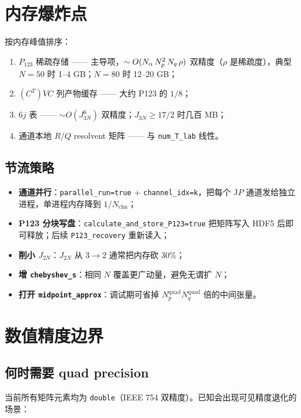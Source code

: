 \section{内存爆炸点}
\label{sec:appF_memory}

按内存峰值排序：
\begin{enumerate}
  \item \(P_{123}\) 稀疏存储 —— 主导项，\(\sim O(N_\alpha\,N_p^2\,N_q\,\rho)\) 双精度（\(\rho\) 是稀疏度），典型 \(N=50\) 时 1–4 GB；\(N=80\) 时 12–20 GB；
  \item \((C^T)V C\) 列产物缓存 —— 大约 P123 的 \(1/8\)；
  \item 6\(j\) 表 —— \(\sim O(J_{3N}^6)\) 双精度；\(J_{3N}\ge 17/2\) 时几百 MB；
  \item 通道本地 \(R\)/\(Q\) resolvent 矩阵 —— 与 \texttt{num\_T\_lab} 线性。
\end{enumerate}

\subsection{节流策略}

\begin{itemize}
  \item \textbf{通道并行}：\texttt{parallel\_run=true} + \texttt{channel\_idx=k}，把每个 J\(P\) 通道发给独立进程，单进程内存降到 \(1/N_\text{chn}\)；
  \item \textbf{P123 分块写盘}：\texttt{calculate\_and\_store\_P123=true} 把矩阵写入 HDF5 后即可释放；后续 \texttt{P123\_recovery} 重新读入；
  \item \textbf{削小 \(J_{2N}\)}：\(J_{2N}\) 从 \(3\to 2\) 通常把内存砍 30\%；
  \item \textbf{增 \texttt{chebyshev\_s}}：相同 \(N\) 覆盖更广动量，避免无谓扩 \(N\)；
  \item \textbf{打开 \texttt{midpoint\_approx}}：调试期可省掉 \(N_p^\text{quad} N_q^\text{quad}\) 倍的中间张量。
\end{itemize}

\section{数值精度边界}
\label{sec:appF_precision}

\subsection{何时需要 quad precision}

当前所有矩阵元素均为 \texttt{double}（IEEE 754 双精度）。已知会出现可见精度退化的场景：

